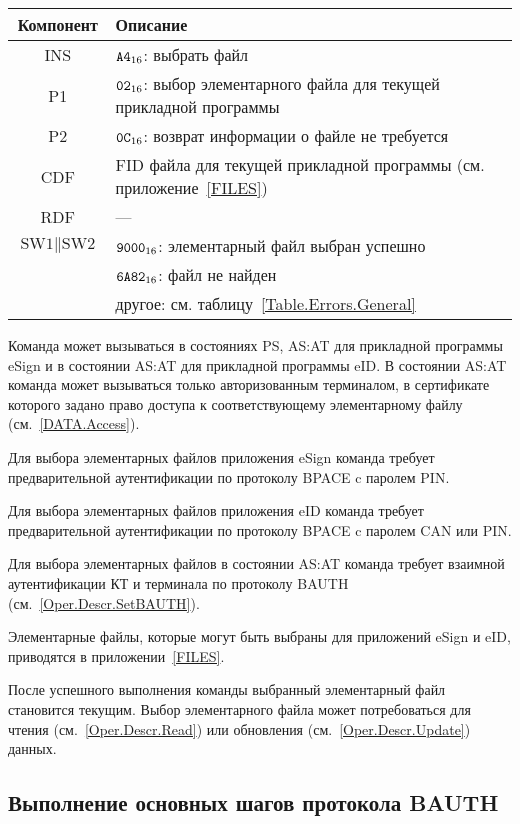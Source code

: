 \begin{table}[hbt]
\caption{}\label{Table.Oper.SelectEFCmd}
\begin{tabular}{|c|p{14cm}|}
\hline
Компонент & Описание \\
\hline
\hline
INS & $\texttt{A4}_{16}$: выбрать файл\\ 
\hline
P1 & $\texttt{02}_{16}$: выбор элементарного файла для текущей прикладной программы\\
\hline
P2 & $\texttt{0C}_{16}$: возврат информации о файле не требуется \\
\hline
CDF & FID файла для текущей прикладной программы (см. приложение~\ref{FILES})\\
\hline 
RDF &  --- \\
\hline
$\text{SW1}\parallel\text{SW2}$ & 
$\texttt{9000}_{16}$: элементарный файл выбран успешно \\
  & $\texttt{6A82}_{16}$: файл не найден \\
  & другое: см. таблицу~\ref{Table.Errors.General}\\
\hline
\end{tabular}
\end{table}

Команда может вызываться в состояниях PS, AS:AT 
для прикладной программы eSign и в состоянии 
AS:AT для прикладной программы eID.
В состоянии AS:AT команда может вызываться только 
авторизованным терминалом, в сертификате которого
задано право доступа к соответствующему элементарному файлу (см.~\ref{DATA.Access}).

Для выбора элементарных файлов приложения eSign команда требует 
предварительной аутентификации по протоколу BPACE c 
паролем PIN.

Для выбора элементарных файлов приложения eID команда требует 
предварительной аутентификации по протоколу BPACE c 
паролем CAN или PIN.

Для выбора элементарных файлов в состоянии AS:AT
команда требует взаимной аутентификации КТ и терминала
по протоколу BAUTH (см.~\ref{Oper.Descr.SetBAUTH}).

Элементарные файлы, которые могут быть выбраны 
для приложений eSign и eID, приводятся в приложении~\ref{FILES}. 

После успешного выполнения команды выбранный элементарный файл
становится текущим.
Выбор элементарного файла может потребоваться для
чтения (см.~\ref{Oper.Descr.Read}) или 
обновления (см.~\ref{Oper.Descr.Update}) данных.

\subsection{Выполнение основных шагов протокола BAUTH}
\label{Oper.Descr.GABAUTH} 

